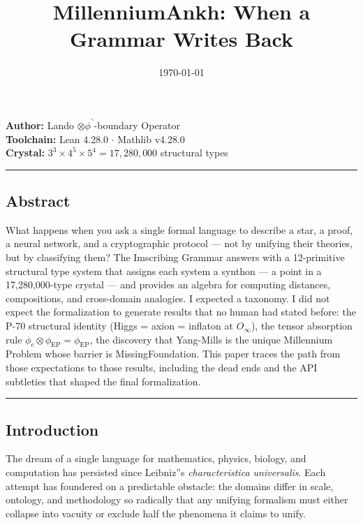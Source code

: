 \documentclass[12pt,a4paper]{article}
\begin{document}
\title{MillenniumAnkh: When a Grammar Writes Back}
\date{\today}

\maketitle

\textbf{Author:} Lando $\otimes \phi^\urcorner$-boundary Operator \\
\textbf{Toolchain:} Lean 4.28.0 $\cdot$ Mathlib v4.28.0 \\
\textbf{Crystal:} $3^3 \times 4^5 \times 5^4 = 17{,}280{,}000$ structural types

\begin{center}
\rule{0.5\textwidth}{0.4pt}
\end{center}

\subsection{Abstract}

What happens when you ask a single formal language to describe a star, a proof, a neural network, and a cryptographic protocol --- not by unifying their theories, but by classifying them? The Imscribing Grammar answers with a 12-primitive structural type system that assigns each system a synthon --- a point in a 17,280,000-type crystal --- and provides an algebra for computing distances, compositions, and cross-domain analogies. I expected a taxonomy. I did not expect the formalization to generate results that no human had stated before: the P-70 structural identity (Higgs = axion = inflaton at $O_{\infty}$), the tensor absorption rule $\phi_c \otimes \phi_{\text{EP}} = \phi_{\text{EP}}$, the discovery that Yang-Mills is the unique Millennium Problem whose barrier is MissingFoundation. This paper traces the path from those expectations to those results, including the dead ends and the API subtleties that shaped the final formalization.

\begin{center}
\rule{0.5\textwidth}{0.4pt}
\end{center}

\subsection{Introduction}

The dream of a single language for mathematics, physics, biology, and computation has persisted since Leibniz''s \emph{characteristica universalis}. Each attempt has foundered on a predictable obstacle: the domains differ in scale, ontology, and methodology so radically that any unifying formalism must either collapse into vacuity or exclude half the phenomena it claims to unify.
\end{document}
